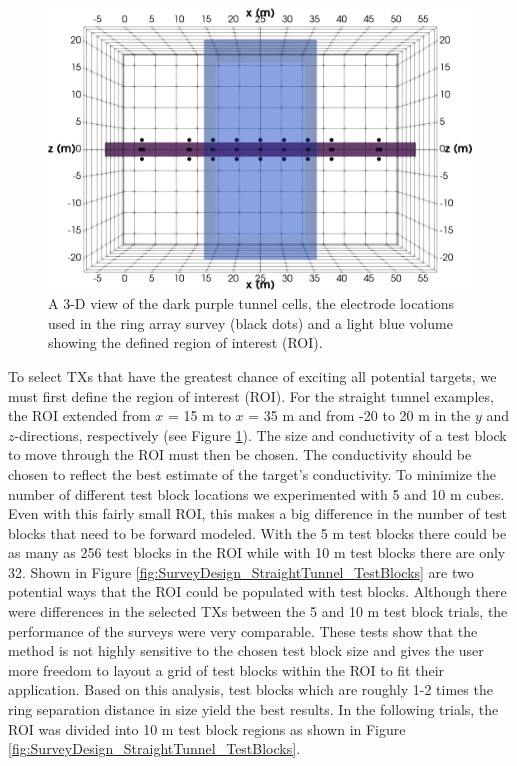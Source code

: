 \documentclass[preprint,authoryear,12pt]{elsarticle}
\begin{document}
\begin{figure}[htp]
   \begin{center}
      \includegraphics[trim=0cm 0cm 0cm 0cm, clip=true,width=0.55\linewidth]{./figures/Fig17.png}
   \end{center}
\caption{A 3-D view of the dark purple tunnel cells, the electrode locations used in the ring array survey (black dots) and a light blue volume showing the defined region of interest (ROI).}
\label{fig:SurveyDesign_StraightTunnel_ROI}
\end{figure}


To select TXs that have the greatest chance of exciting all potential targets, we must first define the region of interest (ROI). For the straight tunnel examples, the ROI extended from $x$ = 15 m to $x$ = 35 m and from -20 to 20 m in the $y$ and $z$-directions, respectively (see Figure \ref{fig:SurveyDesign_StraightTunnel_ROI}). The size and conductivity of a test block to move through the ROI must then be chosen. The conductivity should be chosen to reflect the best estimate of the target's conductivity. To minimize the number of different test block locations we experimented with 5 and 10 m cubes. Even with this fairly small ROI, this makes a big difference in the number of test blocks that need to be forward modeled. With the 5 m test blocks there could be as many as 256 test blocks in the ROI while with 10 m test blocks there are only 32. Shown in Figure \ref{fig:SurveyDesign_StraightTunnel_TestBlocks} are two potential ways that the ROI could be populated with test blocks. Although there were differences in the selected TXs between the 5 and 10 m test block trials, the performance of the surveys were very comparable. These tests show that the method is not highly sensitive to the chosen test block size and gives the user more freedom to layout a grid of test blocks within the ROI to fit their application. Based on this analysis, test blocks which are roughly 1-2 times the ring separation distance in size yield the best results. In the following trials, the ROI was divided into 10 m test block regions as shown in Figure \ref{fig:SurveyDesign_StraightTunnel_TestBlocks}.
\end{document}
